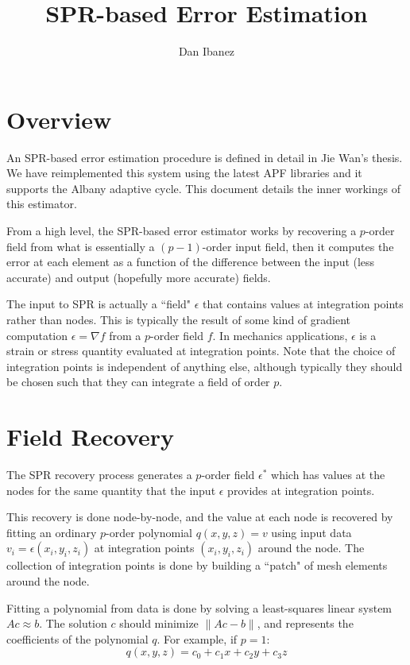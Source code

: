 \documentclass{article}
\title{SPR-based Error Estimation}
\author{Dan Ibanez}
\begin{document}
\maketitle

\section{Overview}
An SPR-based error estimation procedure is defined in detail
in Jie Wan's thesis.
We have reimplemented this system using the latest APF
libraries and it supports the Albany adaptive cycle.
This document details the inner workings of this estimator.

From a high level, the SPR-based error estimator works by
recovering a $p$-order field from what is essentially
a $(p-1)$-order input field, then it computes the
error at each element as a function of the difference
between the input (less accurate) and output
(hopefully more accurate) fields. 

The input to SPR is actually a ``field" $\epsilon$ that contains values
at integration points rather than nodes.
This is typically the result of some kind of gradient computation
$\epsilon = \nabla f$ from a $p$-order field $f$.
In mechanics applications, $\epsilon$ is a strain or stress quantity
evaluated at integration points.
Note that the choice of integration points is independent of
anything else, although typically they should be chosen such
that they can integrate a field of order $p$.

\section{Field Recovery}
The SPR recovery process generates a $p$-order field $\epsilon^*$ which
has values at the nodes for the same quantity that the
input $\epsilon$ provides at integration points.

This recovery is done node-by-node, and the value at each
node is recovered by fitting an ordinary $p$-order polynomial
$q (x, y, z) = v$ using input data $v_i = \epsilon(x_i, y_i, z_i)$
at integration points $(x_i,y_i,z_i)$ around the node.
The collection of integration points is done by building
a ``patch" of mesh elements around the node.

Fitting a polynomial from data is done by solving a least-squares linear
system $Ac \approx b$.
The solution $c$ should minimize $\|Ac - b\|$, and represents
the coefficients of the polynomial $q$.
For example, if $p=1$:
\[q(x,y,z) = c_0 + c_1 x + c_2 y + c_3 z \]
\end{document}
